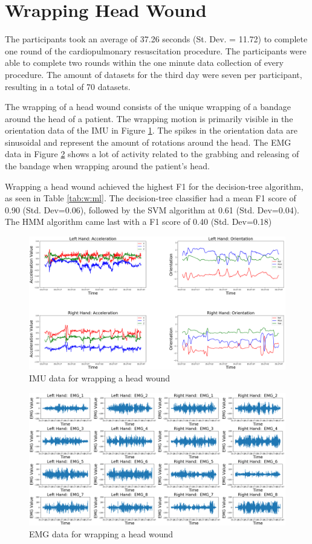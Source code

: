 \section{Wrapping Head Wound}
\label{sec:Results:Wound}
The participants took an average of 37.26 seconds (St. Dev. = 11.72) to complete one round of the cardiopulmonary resuscitation procedure. The participants were able to complete two rounds within the one minute data collection of every procedure. The amount of datasets for the third day were seven per participant, resulting in a total of 70 datasets.
\par The wrapping of a head wound consists of the unique wrapping of a bandage around the head of a patient. The wrapping motion is primarily visible in the orientation data of the IMU in Figure \ref{fig:2334imuday3w47}. The spikes in the orientation data are sinusoidal and represent the amount of rotations around the head. The EMG data in Figure \ref{fig:2334emgday3w47} shows a lot of activity related to the grabbing and releasing of the bandage when wrapping around the patient's head.
\par Wrapping a head wound achieved the highest F1 for the decision-tree algorithm, as seen in Table \ref{tab:w:ml}. The decision-tree classifier had a mean F1 score of 0.90 (Std. Dev=0.06), followed by the SVM algorithm at 0.61 (Std. Dev=0.04). The HMM algorithm came last with a F1 score of 0.40 (Std. Dev=0.18)
\begin{figure}
	\centering
	\includegraphics[width=0.8\linewidth]{pictures/2334_IMU_Day3_w_47}
	\caption{IMU data for wrapping a head wound}
	\label{fig:2334imuday3w47}
\end{figure}
\begin{figure}
	\centering
	\includegraphics[width=0.8\linewidth]{pictures/2334_EMG_Day3_w_47}
	\caption{EMG data for wrapping a head wound}
	\label{fig:2334emgday3w47}
\end{figure}
